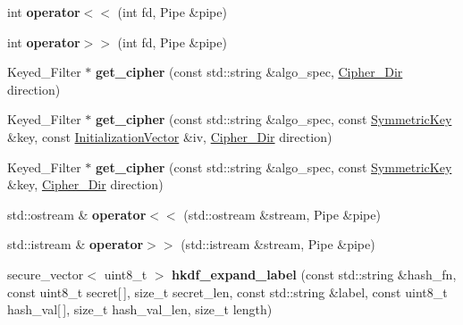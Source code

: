 \begin{DoxyCompactItemize}
int {\bfseries operator$<$$<$} (int fd, Pipe \&pipe)
\item 
\mbox{\label{namespace_botan_aad754977484e0b22a355e21a532a03f2}} 
int {\bfseries operator$>$$>$} (int fd, Pipe \&pipe)
\item 
\mbox{\label{namespace_botan_ac78d533e2e82a7d2b4faa81c5d4224f0}} 
Keyed\+\_\+\+Filter $\ast$ {\bfseries get\+\_\+cipher} (const std\+::string \&algo\+\_\+spec, \mbox{\hyperlink{namespace_botan_a8d9547a8fb3e868810b169b20ac389ee}{Cipher\+\_\+\+Dir}} direction)
\item 
\mbox{\label{namespace_botan_af3dafb0ec13984e6f235962840ed739d}} 
Keyed\+\_\+\+Filter $\ast$ {\bfseries get\+\_\+cipher} (const std\+::string \&algo\+\_\+spec, const \mbox{\hyperlink{namespace_botan_a89cf6c3513428f524454d01830221a88}{Symmetric\+Key}} \&key, const \mbox{\hyperlink{namespace_botan_a2fbf5195ffe701adcabb1f8c41bfc557}{Initialization\+Vector}} \&iv, \mbox{\hyperlink{namespace_botan_a8d9547a8fb3e868810b169b20ac389ee}{Cipher\+\_\+\+Dir}} direction)
\item 
\mbox{\label{namespace_botan_a4812fd30c23cfef674079a880f77d488}} 
Keyed\+\_\+\+Filter $\ast$ {\bfseries get\+\_\+cipher} (const std\+::string \&algo\+\_\+spec, const \mbox{\hyperlink{namespace_botan_a89cf6c3513428f524454d01830221a88}{Symmetric\+Key}} \&key, \mbox{\hyperlink{namespace_botan_a8d9547a8fb3e868810b169b20ac389ee}{Cipher\+\_\+\+Dir}} direction)
\item 
\mbox{\label{namespace_botan_a2aef852313d73e0e847a5470244004c3}} 
std\+::ostream \& {\bfseries operator$<$$<$} (std\+::ostream \&stream, Pipe \&pipe)
\item 
\mbox{\label{namespace_botan_a48c6e40d8646fceedeeb2a9bf662ff2c}} 
std\+::istream \& {\bfseries operator$>$$>$} (std\+::istream \&stream, Pipe \&pipe)
\item 
\mbox{\label{namespace_botan_af1c19b037c4ae9e0c73c604d4df75ebe}} 
secure\+\_\+vector$<$ uint8\+\_\+t $>$ {\bfseries hkdf\+\_\+expand\+\_\+label} (const std\+::string \&hash\+\_\+fn, const uint8\+\_\+t secret\mbox{[}$\,$\mbox{]}, size\+\_\+t secret\+\_\+len, const std\+::string \&label, const uint8\+\_\+t hash\+\_\+val\mbox{[}$\,$\mbox{]}, size\+\_\+t hash\+\_\+val\+\_\+len, size\+\_\+t length)

\end{DoxyCompactItemize}

